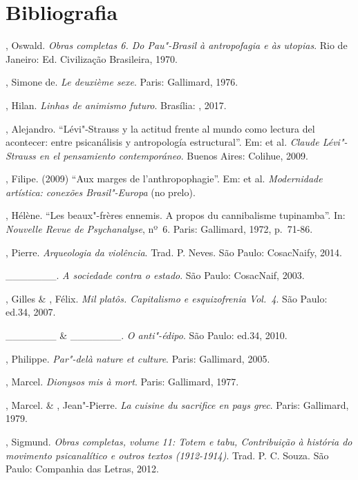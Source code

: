 \pagebreak

\section{Bibliografia}

\begin{Parskip}
, Oswald. \emph{Obras completas 6. Do Pau"-Brasil à antropofagia
e às utopias}. Rio de Janeiro: Ed. Civilização Brasileira, 1970.

, Simone de. \emph{Le deuxième sexe}. Paris: Gallimard, 1976.

, Hilan. \emph{Linhas de animismo futuro}. Brasília: , 2017.

, Alejandro. ``Lévi"-Strauss y la actitud frente al mundo como
lectura del acontecer: entre psicanálisis y antropología estructural''. Em:
 et al. \emph{Claude Lévi"-Strauss en el pensamiento
contemporáneo}. Buenos Aires: Colihue, 2009.

, Filipe. (2009) ``Aux marges de l'anthropophagie''. Em:  et al.
\emph{Modernidade artística: conexões Brasil"-Europa} (no prelo).

, Hélène. ``Les beaux"-frères ennemis. A propos du cannibalisme
tupinamba''. In: \emph{Nouvelle Revue de Psychanalyse}, nº~6. Paris:
Gallimard, 1972, p.~71-86.

, Pierre. \emph{Arqueologia da violência}. Trad. P. Neves. São
Paulo: CosacNaify, 2014.

\_\_\_\_\_\_\_. \emph{A sociedade contra o estado}. São Paulo: CosacNaif, 2003.

, Gilles \& , Félix. \emph{Mil platôs. Capitalismo e
esquizofrenia Vol.~4}. São Paulo: ed.34, 2007.

\_\_\_\_\_\_\_ \& \_\_\_\_\_\_\_. \emph{O anti"-édipo}. São Paulo: ed.34, 2010.

, Philippe. \emph{Par"-delà nature et culture}. Paris: Gallimard, 2005.

, Marcel. \emph{Dionysos mis à mort}. Paris: Gallimard, 1977.

, Marcel. \& , Jean"-Pierre. \emph{La cuisine du sacrifice en
pays grec}. Paris: Gallimard, 1979.

, Sigmund. \emph{Obras completas, volume 11: Totem e tabu, Contribuição à história do movimento psicanalítico e outros textos (1912-1914)}. Trad. P. C. Souza. São Paulo: Companhia das Letras, 2012.


\end{Parskip}
